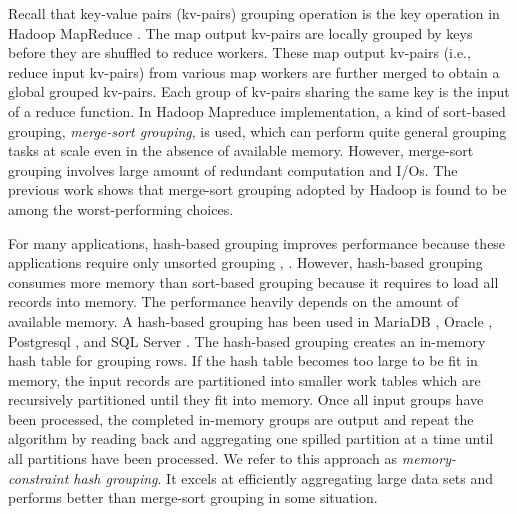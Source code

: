 Recall that key-value pairs (kv-pairs) grouping operation is the key operation in Hadoop MapReduce \cite{dean2008mapreduce}. The map output kv-pairs are locally grouped by keys before they are shuffled to reduce workers. These map output kv-pairs (i.e., reduce input kv-pairs) from various map workers are further merged to obtain a global grouped kv-pairs. Each group of kv-pairs sharing the same key is the input of a reduce function. In Hadoop Mapreduce implementation, a kind of sort-based grouping, \emph{merge-sort grouping}, is used, which can perform quite general grouping tasks at scale even in the absence of available memory. However, merge-sort grouping involves large amount of redundant computation and I/Os. The previous work \cite{shvachko2010hadoop,yu2009distributed,Li2011A} shows that merge-sort grouping adopted by Hadoop is found to be among the worst-performing choices.

For many applications, hash-based grouping improves performance because these applications require only unsorted grouping \cite{lin2011tenzing}, \cite{yu2009distributed}. However, hash-based grouping consumes more memory than sort-based grouping because it requires to load all records into memory. The performance heavily depends on the amount of available memory. A hash-based grouping has been used in MariaDB \cite{bartholomew2012mariadb}, Oracle \cite{stephens2005oracle}, Postgresql \cite{momjian2001postgresql}, and SQL Server \cite{agrawal2005database}. The hash-based grouping creates an in-memory hash table for grouping rows. If the hash table becomes too large to be fit in memory, the input records are partitioned into smaller work tables which are recursively partitioned until they fit into memory. Once all input groups have been processed, the completed in-memory groups are output and repeat the algorithm by reading back and aggregating one spilled partition at a time until all partitions have been processed. We refer to this approach as \emph{memory-constraint hash grouping}. It excels at efficiently aggregating large data sets and performs better than merge-sort grouping in some situation.

